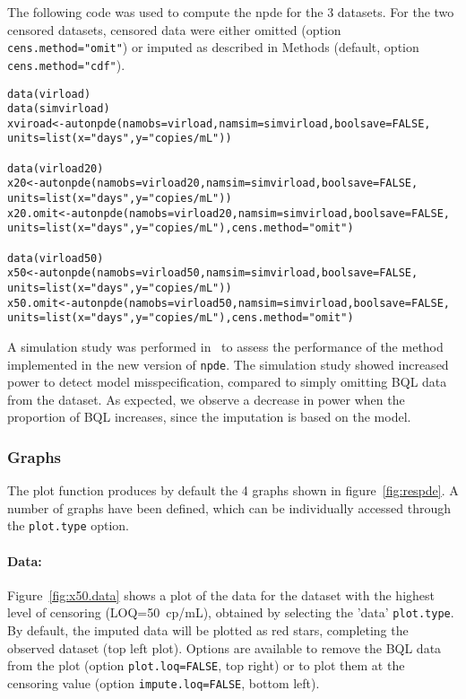 \hskip 18pt The following code was used to compute the npde for the 3 datasets. For the two censored datasets, censored data were either omitted (option \texttt{cens.method="omit"}) or imputed as described in Methods (default, option \texttt{cens.method="cdf"}).

\begin{verbatim}
data(virload)
data(simvirload)
xviroad<-autonpde(namobs=virload,namsim=simvirload,boolsave=FALSE, 
units=list(x="days",y="copies/mL"))

data(virload20)
x20<-autonpde(namobs=virload20,namsim=simvirload,boolsave=FALSE, 
units=list(x="days",y="copies/mL"))
x20.omit<-autonpde(namobs=virload20,namsim=simvirload,boolsave=FALSE, 
units=list(x="days",y="copies/mL"),cens.method="omit")

data(virload50)
x50<-autonpde(namobs=virload50,namsim=simvirload,boolsave=FALSE, 
units=list(x="days",y="copies/mL"))
x50.omit<-autonpde(namobs=virload50,namsim=simvirload,boolsave=FALSE, 
units=list(x="days",y="copies/mL"),cens.method="omit")
\end{verbatim}

A simulation study was performed in~\cite{Nguyen2012} to assess the performance of the method implemented in the new version of \texttt{npde}. The simulation study showed increased power to detect model misspecification, compared to simply omitting BQL data from the dataset. As expected, we observe a decrease in power when the proportion of BQL increases, since the imputation is based on the model.

\subsubsection{Graphs}

\hskip 18pt The plot function produces by default the 4 graphs shown in figure~\ref{fig:respde}. A number of graphs have been defined, which can be individually accessed through the \texttt{plot.type} option.

\paragraph{Data:} Figure~\ref{fig:x50.data} shows a plot of the data for the dataset with the highest level of censoring (LOQ=50~cp/mL), obtained by selecting the 'data' \texttt{plot.type}. By default, the imputed data will be plotted as red stars, completing the observed dataset (top left plot). Options are available to remove the BQL data from the plot (option \texttt{plot.loq=FALSE}, top right) or to plot them at the censoring value (option \texttt{impute.loq=FALSE}, bottom left). 


